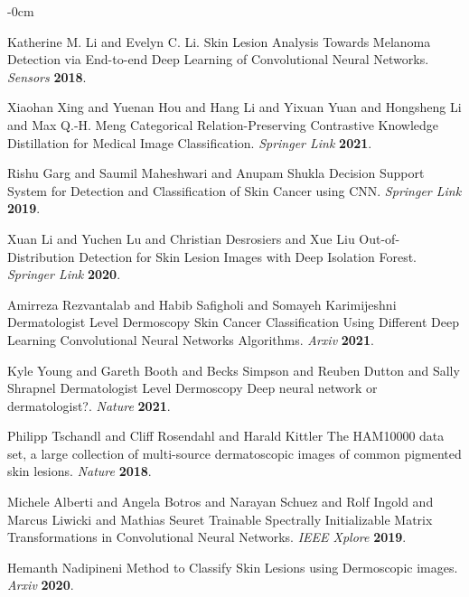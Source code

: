 \documentclass[sensors,article,submit,pdftex,moreauthors]{Definitions/mdpi}
\begin{document}
\begin{adjustwidth}{-\extralength}{0cm}
		\begin{thebibliography}{999}
			
			Katherine M. Li and Evelyn C. Li. Skin Lesion Analysis Towards Melanoma Detection via End-to-end Deep Learning of Convolutional Neural Networks. 
			{\em Sensors} 
			{\bf 2018}.
			
			Xiaohan Xing and Yuenan Hou and  Hang Li and Yixuan Yuan and Hongsheng Li and Max Q.-H. Meng Categorical Relation-Preserving Contrastive Knowledge Distillation for Medical Image Classification. 
			{\em Springer Link} 
			{\bf 2021}.
			
			Rishu Garg and Saumil Maheshwari and Anupam Shukla Decision Support System for Detection and Classification of Skin Cancer using CNN. {\em Springer Link} {\bf 2019}.
			
			Xuan Li and Yuchen Lu and Christian Desrosiers and Xue Liu Out-of-Distribution Detection for Skin Lesion Images with Deep Isolation Forest. 
			{\em Springer Link} 
			{\bf 2020}.
			
			Amirreza Rezvantalab and Habib Safigholi and Somayeh Karimijeshni Dermatologist Level Dermoscopy Skin Cancer Classification Using Different Deep Learning Convolutional Neural Networks Algorithms. 
			{\em Arxiv} 
			{\bf 2021}.
			
			Kyle Young and Gareth Booth and Becks Simpson and Reuben Dutton and Sally Shrapnel Dermatologist Level Dermoscopy Deep neural network or dermatologist?. {\em Nature} 
			{\bf 2021}.
			
			Philipp Tschandl and Cliff Rosendahl and Harald Kittler The HAM10000 data set, a large collection of multi-source dermatoscopic images of common pigmented skin lesions. 
			{\em Nature} 
			{\bf 2018}.
			
			Michele Alberti and Angela Botros and Narayan Schuez and Rolf Ingold and Marcus Liwicki and Mathias Seuret Trainable Spectrally Initializable Matrix Transformations in Convolutional Neural Networks. 
			{\em IEEE Xplore} 
			{\bf 2019}.
			
			Hemanth Nadipineni Method to Classify Skin Lesions using Dermoscopic images. {\em Arxiv} 
			{\bf 2020}.
			

\end{thebibliography}
\end{adjustwidth}
\end{document}
